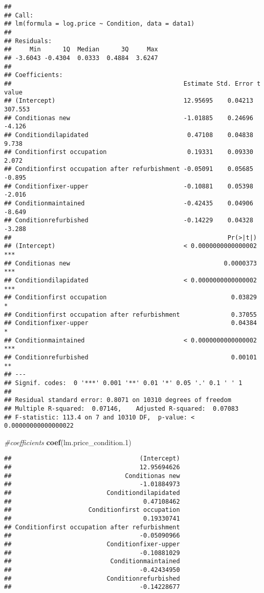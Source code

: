 \documentclass[
]{article}
\newenvironment{Shaded}{\begin{snugshade}}{\end{snugshade}}
\newcommand{\CommentTok}[1]{\textcolor[rgb]{0.56,0.35,0.01}{\textit{#1}}}
\newcommand{\FloatTok}[1]{\textcolor[rgb]{0.00,0.00,0.81}{#1}}
\newcommand{\KeywordTok}[1]{\textcolor[rgb]{0.13,0.29,0.53}{\textbf{#1}}}
\newcommand{\NormalTok}[1]{#1}
\begin{document}
\begin{verbatim}
## 
## Call:
## lm(formula = log.price ~ Condition, data = data1)
## 
## Residuals:
##     Min      1Q  Median      3Q     Max 
## -3.6043 -0.4304  0.0333  0.4884  3.6247 
## 
## Coefficients:
##                                               Estimate Std. Error t value
## (Intercept)                                   12.95695    0.04213 307.553
## Conditionas new                               -1.01885    0.24696  -4.126
## Conditiondilapidated                           0.47108    0.04838   9.738
## Conditionfirst occupation                      0.19331    0.09330   2.072
## Conditionfirst occupation after refurbishment -0.05091    0.05685  -0.895
## Conditionfixer-upper                          -0.10881    0.05398  -2.016
## Conditionmaintained                           -0.42435    0.04906  -8.649
## Conditionrefurbished                          -0.14229    0.04328  -3.288
##                                                           Pr(>|t|)    
## (Intercept)                                   < 0.0000000000000002 ***
## Conditionas new                                          0.0000373 ***
## Conditiondilapidated                          < 0.0000000000000002 ***
## Conditionfirst occupation                                  0.03829 *  
## Conditionfirst occupation after refurbishment              0.37055    
## Conditionfixer-upper                                       0.04384 *  
## Conditionmaintained                           < 0.0000000000000002 ***
## Conditionrefurbished                                       0.00101 ** 
## ---
## Signif. codes:  0 '***' 0.001 '**' 0.01 '*' 0.05 '.' 0.1 ' ' 1
## 
## Residual standard error: 0.8071 on 10310 degrees of freedom
## Multiple R-squared:  0.07146,    Adjusted R-squared:  0.07083 
## F-statistic: 113.4 on 7 and 10310 DF,  p-value: < 0.00000000000000022
\end{verbatim}

\begin{Shaded}
\begin{Highlighting}[]
\CommentTok{#coefficients}
\KeywordTok{coef}\NormalTok{(lm.price_condition}\FloatTok{.1}\NormalTok{)}
\end{Highlighting}
\end{Shaded}

\begin{verbatim}
##                                   (Intercept) 
##                                   12.95694626 
##                               Conditionas new 
##                                   -1.01884973 
##                          Conditiondilapidated 
##                                    0.47108462 
##                     Conditionfirst occupation 
##                                    0.19330741 
## Conditionfirst occupation after refurbishment 
##                                   -0.05090966 
##                          Conditionfixer-upper 
##                                   -0.10881029 
##                           Conditionmaintained 
##                                   -0.42434950 
##                          Conditionrefurbished 
##                                   -0.14228677
\end{verbatim}
\end{document}
